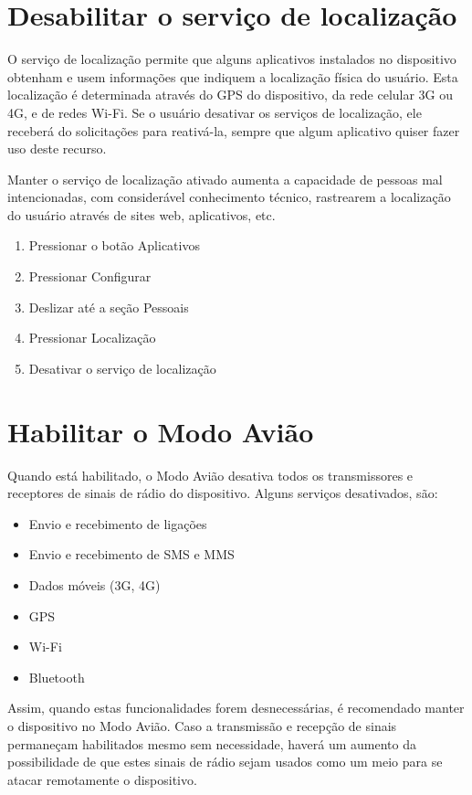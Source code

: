 \section{Desabilitar o servi\c co de localiza\c c\~ao}

O servi\c co de localiza\c c\~ao permite que alguns aplicativos instalados no dispositivo obtenham e usem informa\c c\~oes que indiquem a localiza\c c\~ao f\'isica do usu\'ario. Esta localiza\c c\~ao \'e determinada atrav\'es do GPS do dispositivo, da rede celular 3G ou 4G, e de redes Wi-Fi. 
Se o usu\'ario desativar os servi\c cos de localiza\c c\~ao, ele receber\'a do solicita\c c\~oes para reativ\'a-la, sempre que algum aplicativo quiser fazer uso deste recurso.

Manter o servi\c co de localiza\c c\~ao ativado aumenta a capacidade de pessoas mal intencionadas, com consider\'avel conhecimento t\'ecnico, rastrearem a localiza\c c\~ao do usu\'ario atrav\'es de sites web, aplicativos, etc.

\begin{enumerate}
\item Pressionar o bot\~ao Aplicativos
\item Pressionar Configurar
\item Deslizar at\'e a se\c c\~ao Pessoais
\item Pressionar Localiza\c c\~ao
\item Desativar o servi\c co de localiza\c c\~ao
\end{enumerate}

\section{Habilitar o Modo Avi\~ao}

Quando est\'a habilitado, o Modo Avi\~ao desativa todos os transmissores e receptores de sinais de r\'adio do dispositivo. Alguns servi\c cos desativados, s\~ao:

\begin{itemize}
\item Envio e recebimento de liga\c c\~oes
\item Envio e recebimento de SMS e MMS
\item Dados m\'oveis (3G, 4G)
\item GPS
\item Wi-Fi
\item Bluetooth
\end{itemize}

Assim, quando estas funcionalidades forem desnecess\'arias, \'e recomendado manter o dispositivo no Modo Avi\~ao. Caso a transmiss\~ao e recep\c c\~ao de sinais permane\c cam habilitados mesmo sem necessidade, haver\'a um aumento da possibilidade de que estes sinais de r\'adio sejam usados como um  meio para se atacar remotamente o dispositivo.

